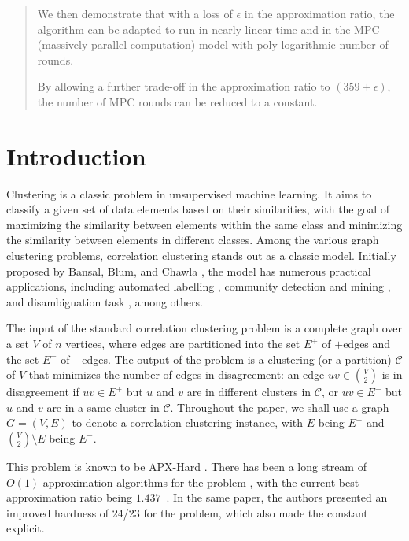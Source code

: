\documentclass[11pt]{article}
\newcommand{\calC}{{\mathcal{C}}}
\begin{document}
\begin{CJK*}{UTF8}{gbsn}
\begin{abstract}
We then demonstrate that with a loss of $\epsilon$ in the approximation ratio, the algorithm can be adapted to run in nearly linear time and in the MPC (massively parallel computation) model with poly-logarithmic number of rounds. 

By allowing a further trade-off in the approximation ratio to $(359+\epsilon)$, the number of MPC rounds can be reduced to a constant. \end{abstract}



\thispagestyle{empty} 
\clearpage

\tableofcontents
\clearpage

\section{Introduction}
Clustering is a classic problem in unsupervised machine learning. It aims to classify a given set of data elements based on their similarities, with the goal of maximizing the similarity between elements within the same class and minimizing the similarity between elements in different classes. Among the various graph clustering problems, correlation clustering stands out as a classic model. Initially proposed by Bansal, Blum, and Chawla \cite{BBC04}, the model has numerous practical applications, including automated labelling \cite{chakrabarti2008graph,agrawal2009generating}, community detection and mining \cite{chen2012clustering,DBLP:conf/www/VeldtGW18,shi2021scalable}, and disambiguation task \cite{kalashnikov2008web}, among others.

The input of the standard correlation clustering problem is a complete graph over a set $V$ of $n$ vertices, where edges are partitioned into  the set $E^+$  of $+$edges and the set $E^-$ of $-$edges.  The output of the problem is a clustering  (or a partition) $\calC$ of $V$ that minimizes the number of edges in disagreement: an edge $uv \in {V \choose 2}$ is in disagreement if $uv \in E^+$ but $u$ and $v$ are in different clusters in $\calC$, or $uv \in E^-$ but $u$ and $v$ are in a same cluster in $\calC$.  Throughout the paper, we shall use a graph $G = (V, E)$ to denote a correlation clustering instance, with $E$ being $E^+$ and ${V \choose 2} \setminus E$ being $E^-$. 

This problem is known to be APX-Hard \cite{CGW05}. There has been a long stream of $O(1)$-approximation algorithms for the problem \cite{BBC04,CGW05,ACN08,CMSY15,CLN22,CLLN23, cao2024understanding}, with the current best approximation ratio being $1.437$~\cite{cao2024understanding}. In the same paper, the authors presented an improved hardness of 24/23 for the problem, which also made the constant explicit. 



\end{CJK*}
\end{document}
